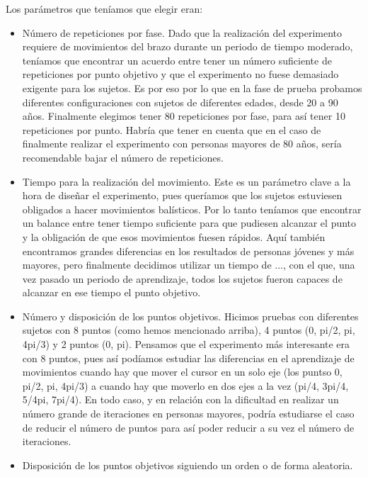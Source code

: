 \documentclass[a4paper,11pt, oneside]{book}
\begin{document}
Los parámetros que teníamos que elegir eran:
\begin{itemize}
	\item Número de repeticiones por fase. Dado que la realización del experimento requiere de movimientos del brazo durante un periodo de tiempo moderado, teníamos que encontrar un acuerdo entre tener un número suficiente de repeticiones por punto objetivo y que el experimento no fuese demasiado exigente para los sujetos. Es por eso por lo que en la fase de prueba probamos diferentes configuraciones con sujetos de diferentes edades, desde 20 a 90 años. Finalmente elegimos tener 80 repeticiones por fase, para así tener 10 repeticiones por punto. Habría que tener en cuenta que en el caso de finalmente realizar el experimento con personas mayores de 80 años, sería recomendable bajar el número de repeticiones.
	\item Tiempo para la realización del movimiento. Este es un parámetro clave a la hora de diseñar el experimento, pues queríamos que los sujetos estuviesen obligados a hacer movimientos balísticos. Por lo tanto teníamos que encontrar un balance entre tener tiempo suficiente para que pudiesen alcanzar el punto y la obligación de que esos movimientos fuesen rápidos. Aquí también encontramos grandes diferencias en los resultados de personas jóvenes y más mayores, pero finalmente decidimos utilizar un tiempo de ..., con el que, una vez pasado un periodo de aprendizaje, todos los sujetos fueron capaces de alcanzar en ese tiempo el punto objetivo.
	\item Número y disposición de los puntos objetivos. Hicimos pruebas con diferentes sujetos con 8 puntos (como hemos mencionado arriba), 4 puntos (0, pi/2, pi, 4pi/3) y 2 puntos (0, pi). Pensamos que el experimento más interesante era con 8 puntos, pues así podíamos estudiar las diferencias en el aprendizaje de movimientos cuando hay que mover el cursor en un solo eje (los puntso 0, pi/2, pi, 4pi/3) a cuando hay que moverlo en dos ejes a la vez (pi/4, 3pi/4, 5/4pi, 7pi/4). En todo caso, y en relación con la dificultad en realizar un número grande de iteraciones en personas mayores, podría estudiarse el caso de reducir el número de puntos para así poder reducir a su vez el número de iteraciones.
	\item Disposición de los puntos objetivos siguiendo un orden o de forma aleatoria.
\end{itemize}
\end{document}
